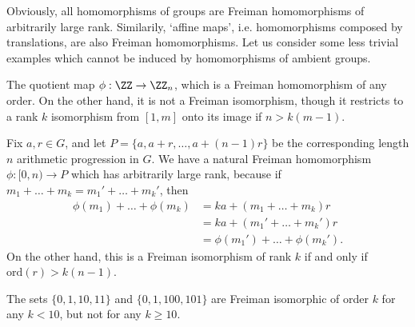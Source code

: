Obviously, all homomorphisms of groups are Freiman homomorphisms of arbitrarily large rank. Similarily, `affine maps', i.e. homomorphisms composed by translations, are also Freiman homomorphisms. Let us consider some less trivial examples which cannot be induced by homomorphisms of ambient groups.

\begin{example}
    The quotient map $\phi: \ZZ \to \ZZ_n$, which is a Freiman homomorphism of any order. On the other hand, it is not a Freiman isomorphism, though it restricts to a rank $k$ isomorphism from $[1,m]$ onto its image if $n > k(m-1)$.
\end{example}

\begin{example}
    Fix $a,r \in G$, and let $P = \{ a, a+r, \dots, a + (n-1)r \}$ be the corresponding length $n$ arithmetic progression in $G$. We have a natural Freiman homomorphism $\phi: [0,n) \to P$ which has arbitrarily large rank, because if $m_1 + \dots + m_k = m_1' + \dots + m_k'$, then
    \begin{align*}
        \phi(m_1) + \dots + \phi(m_k) &= ka + (m_1 + \dots + m_k) r\\
        &= ka + (m_1' + \dots + m_k') r\\
        &= \phi(m_1') + \dots + \phi(m_k').
    \end{align*}
    On the other hand, this is a Freiman isomorphism of rank $k$ if and only if $\text{ord}(r) > k(n-1)$.
\end{example}

\begin{example}
    The sets $\{ 0,1,10,11 \}$ and $\{ 0,1,100,101 \}$ are Freiman isomorphic of order $k$ for any $k < 10$, but not for any $k \geq 10$.
\end{example}

